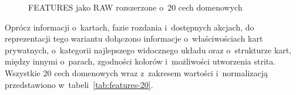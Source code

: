 \begin{figure}[htbp]
    \centering
    \caption{FEATURES jako RAW rozszerzone o~20 cech domenowych}
    \label{fig:state-b-rozszerzenie}
\end{figure}

Oprócz informacji o~kartach, fazie rozdania i~dostępnych akcjach, do
reprezentacji tego wariantu dołączono informacje o~właściwościach kart
prywatnych, o~kategorii najlepszego widocznego układu oraz o~strukturze
kart, między innymi o~parach, zgodności kolorów i~możliwości utworzenia
strita. Wszystkie 20 cech domenowych wraz z~zakresem wartości i~normalizacją
przedstawiono w~tabeli~\ref{tab:features-20}.


